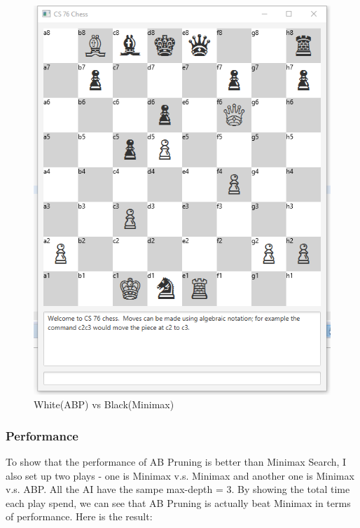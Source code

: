 \documentclass{article}
\begin{document}
\begin{figure}[H]
\centering
\includegraphics[width=0.7\linewidth]{W_ABP_B_MINI}
\caption{White(ABP) vs Black(Minimax)}
\end{figure}

\subsubsection{Performance}
To show that the performance of AB Pruning is better than Minimax Search, I also set up two plays - one is Minimax v.s. Minimax and another one is Minimax v.s. ABP. All the AI have the sampe max-depth = 3. By showing the total time each play spend, we can see that AB Pruning is actually beat Minimax in terms of performance. Here is the result:
\end{document}

